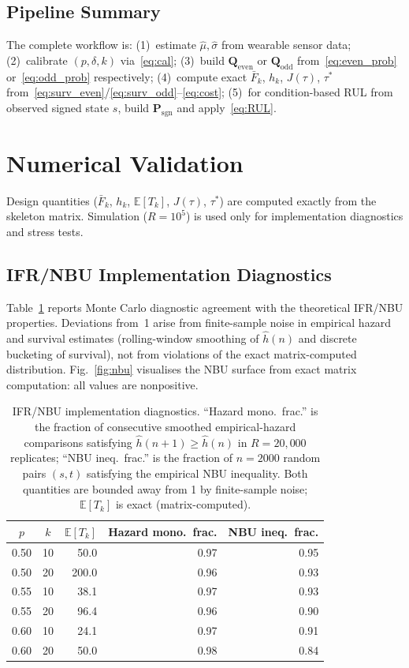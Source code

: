 \documentclass[pdflatex,sn-mathphys-num]{sn-jnl}
\theoremstyle{definition}
\newcommand{\E}{\mathbb{E}}
\numberwithin{equation}{section}
\begin{document}
\subsection{Pipeline Summary}

The complete workflow is: (1)~estimate $\hat\mu,\hat\sigma$ from wearable sensor data; (2)~calibrate $(p,\delta,k)$ via~\eqref{eq:cal}; (3)~build $\mathbf{Q}_{\mathrm{even}}$ or $\mathbf{Q}_{\mathrm{odd}}$ from~\eqref{eq:even_prob} or~\eqref{eq:odd_prob} respectively; (4)~compute exact $\bar{F}_k$, $h_k$, $J(\tau)$, $\tau^*$ from~\eqref{eq:surv_even}/\eqref{eq:surv_odd}--\eqref{eq:cost}; (5)~for condition-based RUL from observed signed state $s$, build $\mathbf{P}_{\mathrm{sgn}}$ and apply~\eqref{eq:RUL}.

\section{Numerical Validation}\label{sec:numerical}

Design quantities ($\bar{F}_k$, $h_k$, $\E[T_k]$, $J(\tau)$, $\tau^*$) are computed exactly from the skeleton matrix. Simulation ($R{=}10^5$) is used only for implementation diagnostics and stress tests.

\subsection{IFR/NBU Implementation Diagnostics}

Table~\ref{tab:ifr} reports Monte Carlo diagnostic agreement with the theoretical IFR/NBU properties. Deviations from~1 arise from finite-sample noise in empirical hazard and survival estimates (rolling-window smoothing of $\hat{h}(n)$ and discrete bucketing of survival), not from violations of the exact matrix-computed distribution. Fig.~\ref{fig:nbu} visualises the NBU surface from exact matrix computation: all values are nonpositive.

\begin{table}[htbp]
\centering
\caption{IFR/NBU implementation diagnostics. ``Hazard mono.\ frac.'' is the fraction of consecutive smoothed empirical-hazard comparisons satisfying $\hat h(n{+}1)\ge\hat h(n)$ in $R{=}20{,}000$ replicates; ``NBU ineq.\ frac.'' is the fraction of $n{=}2000$ random pairs $(s,t)$ satisfying the empirical NBU inequality. Both quantities are bounded away from 1 by finite-sample noise; $\E[T_k]$ is exact (matrix-computed).}
\label{tab:ifr}
\small
\begin{tabular}{ccrrr}
\toprule
$p$ & $k$ & $\E[T_k]$ & Hazard mono.\ frac. & NBU ineq.\ frac. \\
\midrule
0.50 & 10 & 50.0 & 0.97 & 0.95 \\
0.50 & 20 & 200.0 & 0.96 & 0.93 \\
0.55 & 10 & 38.1 & 0.97 & 0.93 \\
0.55 & 20 & 96.4 & 0.96 & 0.90 \\
0.60 & 10 & 24.1 & 0.97 & 0.91 \\
0.60 & 20 & 50.0 & 0.98 & 0.84 \\
\bottomrule
\end{tabular}
\end{table}
\end{document}

